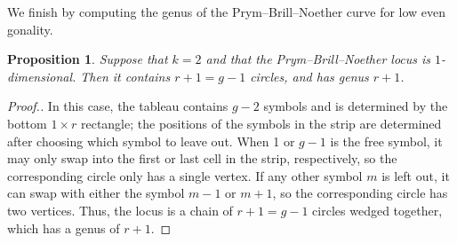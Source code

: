 \documentclass[11pt,reqno]{amsart}
\newcommand{\derek}[1]{{\color{Green} \sf D: [#1]}}
\theoremstyle{definition}
\theoremstyle{problem}
\theoremstyle{plain}
\newtheorem{proposition}[definition]{Proposition}
\theoremstyle{remark}
\theoremstyle{theorem}
\numberwithin{equation}{section}
\numberwithin{figure}{section}
\theoremstyle{definition}
\theoremstyle{problem}
\theoremstyle{plain}
\begin{document}
%

We finish by computing the genus of the Prym--Brill--Noether curve for low even gonality. 
\begin{proposition}\label{prop:k2dim1}
  Suppose that $k=2$ and that the Prym--Brill--Noether locus is $1$-dimensional. Then it contains  $r+1=g-1$ circles, and has genus $r+1$.
\end{proposition}

\begin{proof}[Proof.]
  In this case, the tableau contains $g-2$ symbols and is determined by the bottom $1\times r$ rectangle; the positions of the symbols in the strip are determined after choosing which symbol to leave out.  When 1 or $g-1$ is the free symbol, it may only swap into the first or last cell in the strip,   respectively, so the corresponding circle only has a single vertex. If any other symbol $m$ is left out,  it can swap with either the symbol $m-1$ or $m+1$, so the corresponding circle has two vertices. Thus, the locus is a chain of $r+1=g-1$ circles wedged together, which has a genus of $r+1$.
\end{proof}
\end{document}
